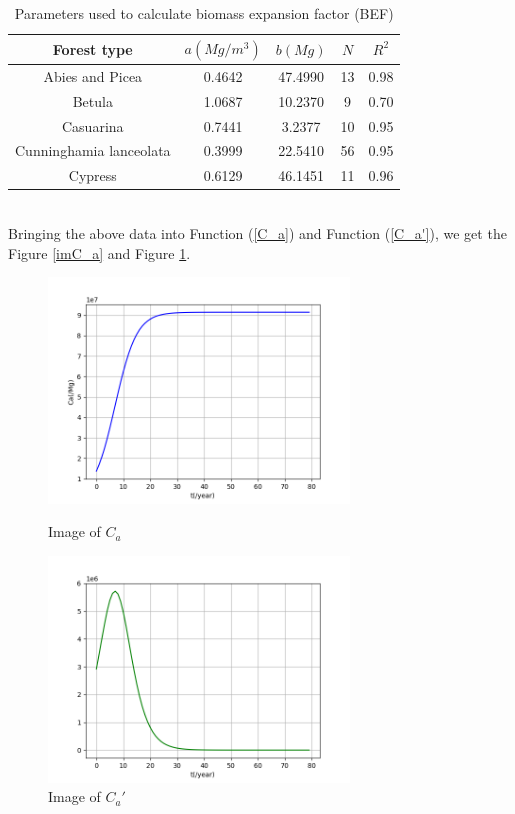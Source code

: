 \documentclass[12pt]{article}
\begin{document}
\begin{table}[hp]
    \centering
    \caption{Parameters used to calculate biomass expansion factor (BEF)\cite{Fang}}
    \begin{tabular}{ccccc}
        \toprule
        \textbf{Forest type}                   & $a(Mg/m^3)$ & $b(Mg)$ & $N$ & $R^2$ \\
        \midrule
        Abies and Picea                        & 0.4642      & 47.4990 & 13  & 0.98  \\
        Betula                                 & 1.0687      & 10.2370 & 9   & 0.70  \\
        Casuarina                              & 0.7441      & 3.2377  & 10  & 0.95  \\
        \rowcolor{pink}Cunninghamia lanceolata & 0.3999      & 22.5410 & 56  & 0.95  \\
        Cypress                                & 0.6129      & 46.1451 & 11  & 0.96  \\
        \bottomrule
    \end{tabular}

\end{table}\\
Bringing the above data into Function (\ref{C_a}) and Function (\ref{C_a'}), we get the Figure \ref{imC_a} and Figure \ref{imC_a'}.
\begin{figure}[hp]
    \centering
    \begin{minipage}{8cm}
        \centering
        \includegraphics[width=8cm]{Ca.png}
        \caption{Image of $C_a$}
        \label{imC_a}
    \end{minipage}
    \qquad
    \begin{minipage}{8cm}
        \centering
        \includegraphics[width=8cm]{Ca2.png}
        \caption{Image of $C_a'$}
        \label{imC_a'}
    \end{minipage}
\end{figure}
\end{document}

